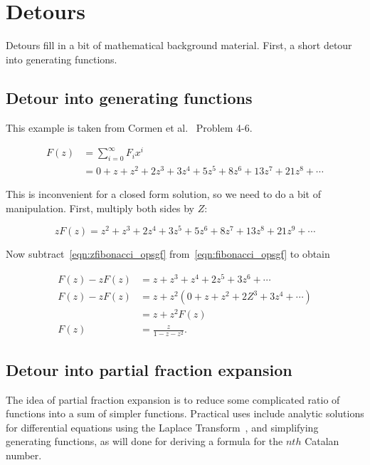 \documentclass{article}
\begin{document}
\appendix

\section{Detours}

Detours fill in a bit of mathematical background material.
First, a short detour into generating functions.

\subsection{Detour into generating functions}

This example is taken from Cormen et al.~\cite[p. 74]{cormen:th:1990}
Problem 4-6.

\begin{align}
F(z) & = \sum_{i=0}^{\infty} F_ix^i\\
\label{eqn:fibonacci_opsgf}
     & = 0 + z + z^2 + 2z^3 + 3z^4 + 5z^5 + 8z^6 + 13z^7 + 21z^8+\cdots
\end{align}

This is inconvenient for a closed form solution, so we need to do a bit of
manipulation. First, multiply both sides by $Z$:

\begin{equation}
\label{eqn:zfibonacci_opsgf}
zF(z) = z^2 + z^3 + 2z^4 + 3z^5 + 5z^6 + 8z^7 + 13z^8 + 21z^9+\cdots
\end{equation}

Now subtract~\ref{eqn:zfibonacci_opsgf} from~\ref{eqn:fibonacci_opsgf} to
obtain

\begin{align}
F(z) - zF(z) & = z + z^3 + z^4 + 2z^5 + 3z^6 +\cdots\\
F(z) - zF(z) & = z + z^2(0 + z + z^2 + 2Z^3 + 3z^4 +\cdots)\\
             & = z + z^2F(z)\\
        F(z) & = \frac{z}{1-z-z^2}.
\end{align}


\subsection{Detour into partial fraction expansion}

The idea of partial fraction expansion is to reduce some
complicated ratio of functions into a sum of simpler functions.
Practical uses include analytic solutions for differential equations
using the Laplace Transform~\cite[p. 347]{nagle:rk1989}, and simplifying
generating functions, as will done for deriving a formula for the
$nth$ Catalan number.
\end{document}
